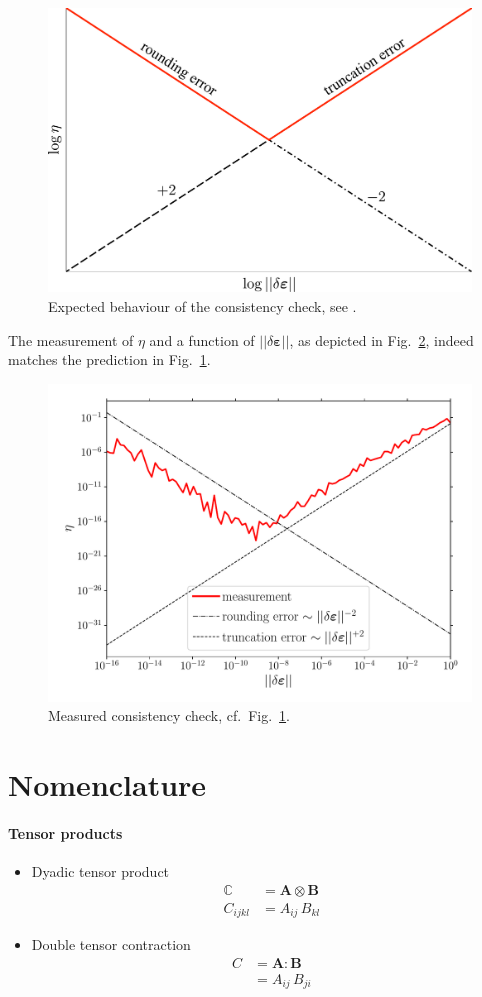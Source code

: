 \documentclass{goose-article}
\begin{document}
\begin{figure}[htp]
  \centering
  \includegraphics[width=.5\textwidth]{figures/consistency}
  \caption{Expected behaviour of the consistency check, see \citet[p.~9]{Heath2002}.}
  \label{fig:consistency:expected}
\end{figure}

The measurement of $\eta$ and a function of $|| \delta \bm{\varepsilon} ||$, as depicted in Fig.~\ref{fig:consistency}, indeed matches the prediction in Fig.~\ref{fig:consistency:expected}.

\begin{figure}[htp]
  \centering
  \includegraphics[width=.5\textwidth]{examples/consistency}
  \caption{Measured consistency check, cf.\ Fig.~\ref{fig:consistency:expected}.}
  \label{fig:consistency}
\end{figure}



\appendix
\vfill\newpage

\section{Nomenclature}
\label{sec:ap:nomenclature}

\paragraph{Tensor products}
\vspace*{.5eM}

\begin{itemize}
%
\item Dyadic tensor product
\begin{align}
  \mathbb{C} &= \bm{A} \otimes \bm{B} \\
  C_{ijkl}   &= A_{ij} \,      B_{kl}
\end{align}
%
\item Double tensor contraction
\begin{align}
  C &= \bm{A} : \bm{B} \\
    &= A_{ij} \, B_{ji}
\end{align}
%
\end{itemize}
\end{document}
